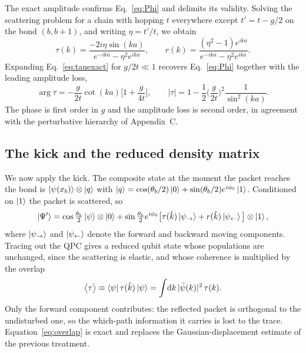 \documentclass[10pt,
 amsmath,amssymb,
 aps,prb, twocolumn
]{revtex4-2}
\begin{document}
The exact amplitude confirms Eq.~\eqref{eq:Phi} and delimits its validity.
Solving the scattering problem for a chain with hopping $t$ everywhere
except $t'=t-g/2$ on the bond $(b,b+1)$, and writing $\eta=t'/t$, we obtain
\begin{equation}
\tau(k)=\frac{-2i\eta\sin (ka)}{e^{-ika}-\eta^{2}e^{ika}},
\qquad
r(k)=\frac{(\eta^{2}-1)e^{ika}}{e^{-ika}-\eta^{2}e^{ika}}.
\label{eq:tauexact}
\end{equation}
Expanding Eq.~\eqref{eq:tauexact} for $g/2t\ll1$ recovers
Eq.~\eqref{eq:Phi} together with the leading amplitude loss,
\begin{equation}
\arg\tau=-\frac{g}{2t}\cot(ka)\Big[1+\frac{g}{4t}\Big],
\qquad
|\tau|=1-\frac{1}{2}\Big(\frac{g}{2t}\Big)^{2}\frac{1}{\sin^{2}(ka)}.
\label{eq:expand}
\end{equation}
The phase is first order in $g$ and the amplitude loss is second order, in
agreement with the perturbative hierarchy of Appendix~C.

\subsection{The kick and the reduced density matrix}
\label{app:vn:kick}

We now apply the kick. The composite state at the moment the packet reaches
the bond is $\ket{\psi(x_b)}\otimes\ket{q}$ with
$\ket{q}=\cos(\theta_b/2)\ket{0}+\sin(\theta_b/2)e^{i\phi_0}\ket{1}$.
Conditioned on $\ket{1}$ the packet is scattered, so
\begin{equation}
\ket{\Psi'}=\cos\tfrac{\theta_b}{2}\ket{\psi}\otimes\ket{0}
+\sin\tfrac{\theta_b}{2}e^{i\phi_0}
\big[\tau(\hat k)\ket{\psi_\rightarrow}+r(\hat k)\ket{\psi_\leftarrow}\big]\otimes\ket{1},
\label{eq:Psiprime}
\end{equation}
where $\ket{\psi_\rightarrow}$ and $\ket{\psi_\leftarrow}$ denote the
forward and backward moving components. Tracing out the QPC gives a
reduced qubit state whose populations are unchanged, since the scattering is
elastic, and whose coherence is multiplied by the overlap
\begin{equation}
\big\langle\tau\big\rangle
\equiv\bra{\psi}\tau(\hat k)\ket{\psi}
=\int\!\mathrm{d}k\,|\tilde\psi(k)|^{2}\,\tau(k).
\label{eq:overlap}
\end{equation}
Only the forward component contributes: the reflected packet is
orthogonal to the undisturbed one, so the which-path information it carries
is lost to the trace. Equation~\eqref{eq:overlap} is exact and replaces the
Gaussian-displacement estimate of the previous treatment.
\end{document}
